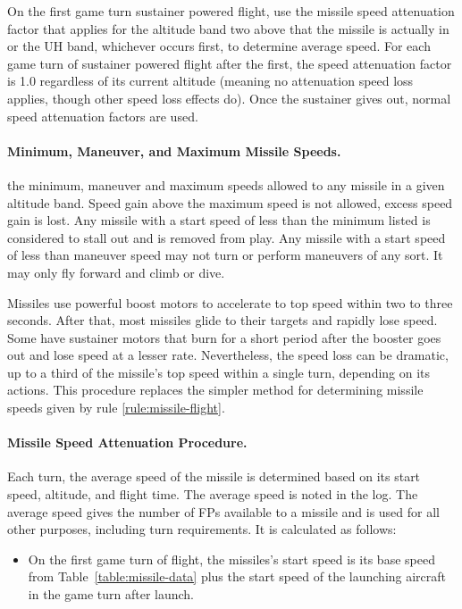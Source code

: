 \begin{advancedrules}
{On the first game turn sustainer powered flight, use the missile speed attenuation factor that applies for the altitude band two above that the missile is actually in or the UH band, whichever occurs first, to determine average speed. For each game turn of sustainer powered flight after the first, the speed attenuation factor is 1.0 regardless of its current altitude (meaning no attenuation speed loss applies, though other speed loss effects do). Once the sustainer gives out, normal speed attenuation factors are used.

\paragraph{Minimum, Maneuver, and Maximum Missile Speeds.}  the minimum, maneuver and maximum speeds allowed to any missile in a given altitude band. Speed gain above the maximum speed is not allowed, excess speed gain is lost. Any missile with a start speed of less than the minimum listed is considered to stall out and is removed from play. Any missile with a start speed of less than maneuver speed may not turn or perform maneuvers of any sort. It may only fly forward and climb or dive.

}{

Missiles use powerful boost motors to accelerate to top speed within two to three seconds. After that, most missiles glide to their targets and rapidly lose speed. Some have sustainer motors that burn for a short period after the booster goes out and lose speed at a lesser rate. Nevertheless, the speed loss can be dramatic, up to a third of the missile’s top speed within a single turn, depending on its actions. This procedure replaces the simpler method for determining missile speeds given by rule \ref{rule:missile-flight}.

\paragraph{Missile Speed Attenuation Procedure.}
Each turn, the average speed of the missile is determined based on its start speed, altitude, and flight time. The average speed is noted in the log. The average speed gives the number of FPs available to a missile and is used for all other purposes, including turn requirements. It is calculated as follows:
\begin{itemize}
\item 
On the first game turn of flight, the missiles’s start speed is its base speed from Table~\ref{table:missile-data} plus the start speed of the launching aircraft in the game turn after launch.


\end{itemize}}
\end{advancedrules}
